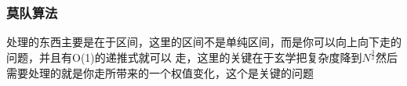 \documentclass[a4paper,11pt]{article}
\begin{document}
\begin{CJK}{UTF8}{gbsn}
\subsubsection{莫队算法}
处理的东西主要是在于区间，这里的区间不是单纯区间，而是你可以向上向下走的问题，并且有O(1)的递推式就可以
走，这里的关键在于玄学把复杂度降到$N^{\frac{3}{2}}$然后需要处理的就是你走所带来的一个权值变化，这个是关键的问题
\inputminted{c++}{../scoure/date/mudui.cpp}
\end{CJK}
\end{document}
